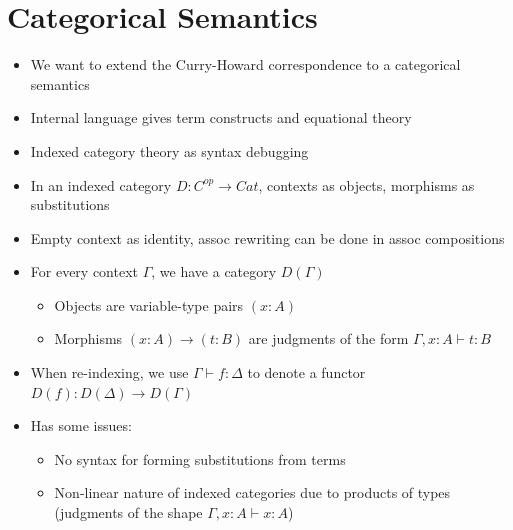 \documentclass[11pt]{article}
\begin{document}
\section{Categorical Semantics}
\begin{itemize}
    \item We want to extend the Curry-Howard correspondence to a categorical semantics
    \item Internal language gives term constructs and equational theory
    \item Indexed category theory as syntax debugging
    \item In an indexed category $D : C^{op} \to Cat$, contexts as objects, morphisms as substitutions
    \item Empty context as identity, assoc rewriting can be done in assoc compositions
    \item For every context $\Gamma$, we have a category $D(\Gamma)$
        \begin{itemize}
            \item Objects are variable-type pairs $(x : A)$
            \item Morphisms $(x : A) \to (t : B)$ are judgments of the form $\Gamma, x : A \vdash t : B$
        \end{itemize}
    \item When re-indexing, we use $\Gamma \vdash f : \Delta$ to denote a functor $D(f) : D(\Delta) \to D(\Gamma)$
    \item Has some issues: 
    \begin{itemize}
        \item No syntax for forming substitutions from terms 
        \item Non-linear nature of indexed categories due to products of types (judgments of the shape $\Gamma, x:A \vdash x:A$)
    \end{itemize}
\end{itemize}
\end{document}

